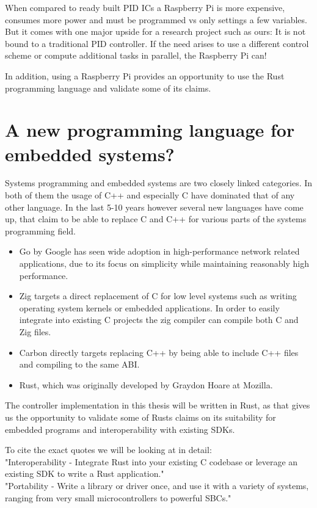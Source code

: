 When compared to ready built PID ICs a Raspberry Pi is more expensive, consumes more power and must be programmed vs only settings a few variables.
But it comes with one major upside for a research project such as ours:
It is not bound to a traditional PID controller. If the need arises to use a different control scheme or compute additional tasks in parallel, the Raspberry Pi can!

In addition, using a Raspberry Pi provides an opportunity to use the Rust programming language and validate some of its claims.

\section{A new programming language for embedded systems?}
\label{sec:introduction:rust}

Systems programming and embedded systems are two closely linked categories.
In both of them the usage of C++ and especially C have dominated that of any other language.
In the last 5-10 years however several new languages have come up,
that claim to be able to replace C and C++ for various parts of the systems programming field.
\begin{itemize}
    \item Go by Google has seen wide adoption in high-performance network related applications, due to its focus on simplicity while maintaining reasonably high performance.\cite{Go}
    \item Zig targets a direct replacement of C for low level systems such as writing operating system kernels or embedded applications. In order to easily integrate into existing C projects the zig compiler can compile both C and Zig files.\cite{Zig}
    \item Carbon directly targets replacing C++ by being able to include C++ files and compiling to the same ABI.\cite{Carbon}
    \item Rust, which was originally developed by Graydon Hoare at Mozilla.\cite{TheRustProgrammingLanguage}
\end{itemize}

The controller implementation in this thesis will be written in Rust,
as that gives us the opportunity to validate some of Rusts claims on its suitability for embedded programs and interoperability with existing SDKs.

To cite the exact quotes we will be looking at in detail:\\
"Interoperability - Integrate Rust into your existing C codebase or leverage an existing SDK to write a Rust application."\\
"Portability - Write a library or driver once, and use it with a variety of systems, ranging from very small microcontrollers to powerful SBCs."\\
\cite{RustEmbeddedSite}

